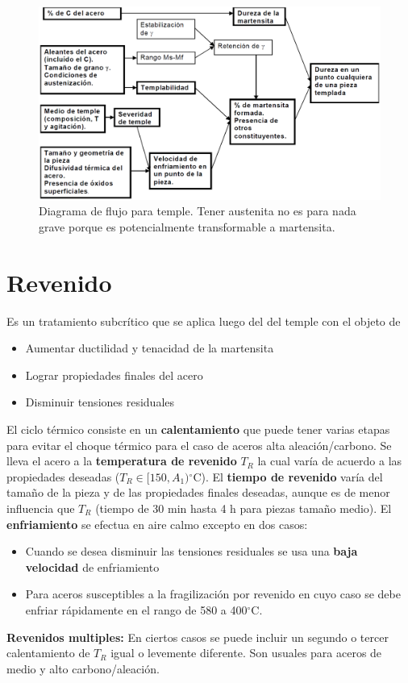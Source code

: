 \documentclass{article}
\newcommand{\Aone}{A\ensuremath{_{1}}}
\newcommand{\grad}{\ensuremath{^\circ \mathrm{C}}}
\begin{document}
\begin{figure}[htb!]
    \centering
    \includegraphics[width=.9\textwidth]{fig/flowdiagTemple.PNG}
    \caption{Diagrama de flujo para temple. Tener austenita no es para nada grave porque es potencialmente transformable a martensita.}
    \label{fig:flowdiagTemple}
\end{figure}

\section{Revenido}
Es un tratamiento subcrítico que se aplica luego del del temple con el objeto de 
\begin{itemize}
    \item Aumentar ductilidad y tenacidad de la martensita
    \item Lograr propiedades finales del acero
    \item Disminuir tensiones residuales
\end{itemize}

El ciclo térmico consiste en un \textbf{calentamiento} que puede tener varias etapas para evitar el choque térmico para el caso de aceros alta aleación/carbono. Se lleva el acero a la \textbf{temperatura de revenido} $T_R$ la cual varía de acuerdo a las propiedades deseadas ($T_R\in [150, \Aone )$\grad{}).  El \textbf{tiempo de revenido} varía del tamaño de la pieza y de las propiedades finales deseadas, aunque es de menor influencia que $T_R$ (tiempo de 30 min hasta 4 h para piezas tamaño medio). El \textbf{enfriamiento} se efectua en aire calmo excepto en dos casos: 
\begin{itemize}
    \item Cuando se desea disminuir las tensiones residuales se usa una \textbf{baja velocidad} de enfriamiento
    \item Para aceros susceptibles a la fragilización por revenido en cuyo caso se debe enfriar rápidamente en el rango de 580 a 400\grad.
\end{itemize}
\textbf{Revenidos multiples:} En ciertos casos se puede incluir un segundo o tercer calentamiento de $T_R$ igual o levemente diferente. Son usuales para aceros de medio y alto carbono/aleación.
\end{document}
